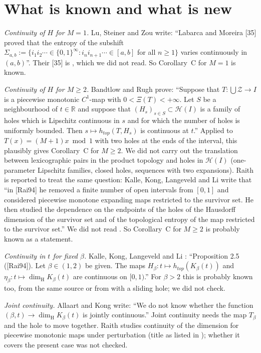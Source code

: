 \documentclass[11pt]{amsart}
\theoremstyle{definition}
\theoremstyle{remark}
\newcommand{\dimH}{\dim_{\mathrm H}}
\begin{document}
\section{What is known and what is new}\label{sec:status}

\emph{Continuity of $H$ for $M=1$.} Lu, Steiner and Zou \cite[Section~1, arXiv v2]{LSZ} write: ``Labarca and Moreira [35] proved that the entropy of the subshift $\Sigma_{a,b}:=\{i_1i_2\cdots\in\{0,1\}^\infty:i_ni_{n+1}\cdots\in[a,b]$ for all $n\ge1\}$ varies continuously in $(a,b)$''. Their [35] is \cite{LM}, which we did not read. So Corollary~C for $M=1$ is known.

\emph{Continuity of $H$ for $M\ge2$.} Bandtlow and Rugh \cite[Theorem~1.2, arXiv v2]{BR} prove: ``Suppose that $T:\bigcup\mathcal Z\to I$ is a piecewise monotonic $C^1$-map with $0<\Xi(T)<+\infty$. Let $S$ be a neighbourhood of $t\in\mathbb R$ and suppose that $(H_s)_{s\in S}\subset\mathcal H(I)$ is a family of holes which is Lipschitz continuous in $s$ and for which the number of holes is uniformly bounded. Then $s\mapsto h_{top}(T,H_s)$ is continuous at $t$.'' Applied to $T(x)=(M+1)x\bmod1$ with two holes at the ends of the interval, this plausibly gives Corollary~C for $M\ge2$. We did not carry out the translation between lexicographic pairs in the product topology and holes in $\mathcal H(I)$ (one-parameter Lipschitz families, closed holes, sequences with two expansions). Raith \cite{Raith94} is reported to treat the same question: Kalle, Kong, Langeveld and Li \cite[Section~2, arXiv v1]{KKLL} write that ``in [Rai94] he removed a finite number of open intervals from $[0,1]$ and considered piecewise monotone expanding maps restricted to the survivor set. He then studied the dependence on the endpoints of the holes of the Hausdorff dimension of the survivor set and of the topological entropy of the map restricted to the survivor set.'' We did not read \cite{Raith94}. So Corollary~C for $M\ge2$ is probably known as a statement.

\emph{Continuity in $t$ for fixed $\beta$.} Kalle, Kong, Langeveld and Li \cite[Proposition~2.5, arXiv v1]{KKLL}: ``Proposition 2.5 ([Rai94]). Let $\beta\in(1,2)$ be given. The maps $H_\beta:t\mapsto h_{top}(K_\beta(t))$ and $\eta_\beta:t\mapsto\dimH K_\beta(t)$ are continuous on $[0,1)$.'' For $\beta>2$ this is probably known too, from the same source or from \cite{BR} with a sliding hole; we did not check.

\emph{Joint continuity.} Allaart and Kong \cite[Remark~1.2, arXiv v3]{AKgen} write: ``We do not know whether the function $(\beta,t)\to\dimH K_\beta(t)$ is jointly continuous.'' Joint continuity needs the map $T_\beta$ and the hole to move together. Raith \cite{Raith92} studies continuity of the dimension for piecewise monotonic maps under perturbation (title as listed in \cite{KKLL}); whether it covers the present case was not checked.
\end{document}
